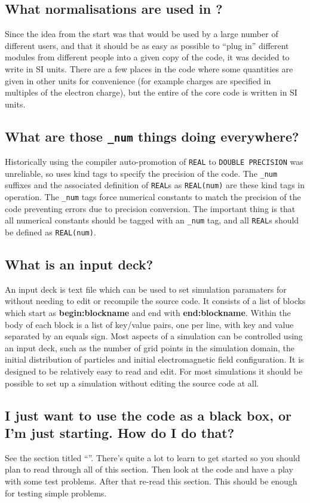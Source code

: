 \documentclass[12pt,a4paper]{article}
\newcommand{\sectit}[1]{See the section titled ``{\bf\titleref{sec:#1}}''.}
\newcommand{\code}[1]{{\texttt{#1}}}
\newcommand{\inlineemph}[1]{{\color{warwicklight} \bf{#1}}}
\newcommand{\EPOCH}{{\color{warwickdark}\fontfamily{phv}\selectfont{EPOCH}}}
\begin{document}
\subsection{What normalisations are used in {\EPOCH}?}
Since the idea from the start was that {\EPOCH} would be used by a large number
of different users, and that it should be as easy as possible to ``plug in''
different modules from different people into a given copy of the code, it was
decided to write {\EPOCH} in SI units. There are a few places in the code where
some quantities are given in other units for convenience (for example charges
are specified in multiples of the electron charge), but the entire of the core
code is written in SI units.

\subsection{What are those \code{\_num} things doing everywhere?}
Historically using the compiler auto-promotion of \code{REAL} to
\code{DOUBLE PRECISION} was unreliable, so {\EPOCH} uses kind tags to specify
the precision of the code. The \code{\_num} suffixes and the associated
definition of \code{REAL}s as \code{REAL(num)} are these kind tags in
operation. The \code{\_num} tags force numerical constants to match the
precision of the code preventing errors due to precision conversion. The
important thing is that all numerical constants should be tagged with an
\code{\_num} tag, and all \code{REAL}s should be defined as \code{REAL(num)}.

\subsection{What is an input deck?}
An input deck is text file which can be used to set simulation paramaters
for {\EPOCH} without needing to edit or recompile the source code.
It consists of a list of blocks which start as \inlineemph{begin:blockname}
and end with \inlineemph{end:blockname}. Within the body of each block is
a list of key/value pairs, one per line, with key and value separated by
an equals sign. Most aspects of a simulation can be controlled using an
input deck, such as the number of grid points in the simulation domain,
the initial distribution of particles and initial electromagnetic field
configuration. It is designed to be relatively easy to read and edit. For
most simulations it should be possible to set up a simulation without
editing the source code at all.

\subsection{I just want to use the code as a black box, or I'm just
  starting. How do I do that?}
\sectit{gettingstarted} There's quite a lot to learn to get started so you
should plan to read through all of this section. Then look at the code and have
a play with some test problems. After that re-read this section. This should be
enough for testing simple problems.
\end{document}
